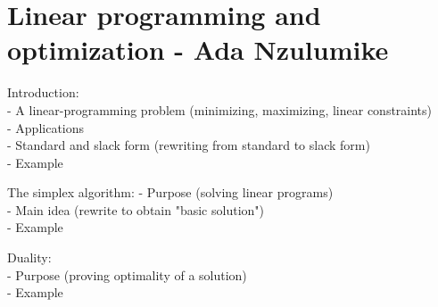 \section*{Linear programming and optimization - Ada Nzulumike}

Introduction:
\\
- A linear-programming problem (minimizing, maximizing, linear constraints)
\\
- Applications
\\
- Standard and slack form (rewriting from standard to slack form)
\\
- Example

The simplex algorithm:
- Purpose (solving linear programs)
\\
- Main idea (rewrite to obtain "basic solution")
\\
- Example

Duality:
\\
- Purpose (proving optimality of a solution)
\\
- Example
